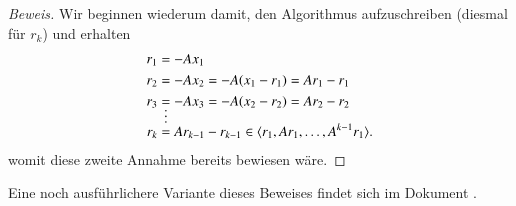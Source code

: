 \begin{proof}[Beweis]
Wir beginnen wiederum damit, den Algorithmus aufzuschreiben (diesmal für $r_k$) und erhalten
\begin{align}
	r_1 &= -Ax_1 \nonumber\\
	r_2	&= -Ax_2 = -A(x_1-r_1) = Ar_1 - r_1 \nonumber\\
	r_3 &= -Ax_3 = -A(x_2-r_2) = Ar_2 - r_2 \nonumber\\
	&\shortvdotswithin{=} \nonumber
	r_k &= Ar_{k-1} - r_{k-1} \in \langle r_1, Ar_1, \dots, A^{k-1}r_1 \rangle.
\end{align}
womit diese zweite Annahme bereits bewiesen wäre.
\end{proof}

Eine noch ausführlichere Variante dieses Beweises findet sich im Dokument \cite{cg:online:cgmueller}.

	
